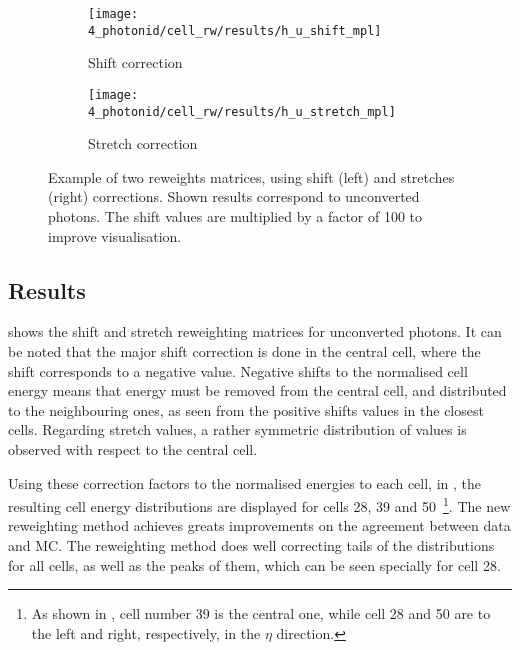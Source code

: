 \begin{figure}[ht!]
    \centering
    \begin{subfigure}[h]{0.49\linewidth}
        \centering
        \texttt{[image: 4\_photonid/cell\_rw/results/h\_u\_shift\_mpl]}
        \caption{Shift correction}
    \end{subfigure}
    \hfill
    \begin{subfigure}[h]{0.49\linewidth}
        \centering
        \texttt{[image: 4\_photonid/cell\_rw/results/h\_u\_stretch\_mpl]}
        \caption{Stretch correction}
    \end{subfigure}
    \caption{Example of two reweights matrices, using shift (left) and stretches (right) corrections. Shown results correspond to unconverted photons. The shift values are multiplied by a factor of 100 to improve visualisation.}
    \label{fig:ss_corrections:cell_rw:calculation:new:reweights}
\end{figure}









\subsection{Results}
\label{subsec:ss_corrections:cell_rw:results}

\Fig{\ref{fig:ss_corrections:cell_rw:calculation:new:reweights}} shows the shift and stretch reweighting matrices for unconverted photons. It can be noted that the major shift correction is done in the central cell, where the shift corresponds to a negative value. Negative shifts to the normalised cell energy means that energy must be removed from the central cell, and distributed to the neighbouring ones, as seen from the positive shifts values in the closest cells. Regarding stretch values, a rather symmetric distribution of values is observed with respect to the central cell.

Using these correction factors to the normalised energies to each cell, in \Fig{\ref{fig:ss_corrections:cell_rw:results:cells}}, the resulting cell energy distributions are displayed for cells 28, 39 and 50~\footnote{As shown in \Fig{\ref{fig:ss_corrections:cell_rw:event_selection:cluster:arrangement}}, cell number 39 is the central one, while cell 28 and 50 are to the left and right, respectively, in the \(\eta\) direction.}. The new reweighting method achieves greats improvements on the agreement between data and MC. The reweighting method does well correcting tails of the distributions for all cells, as well as the peaks of them, which can be seen specially for cell 28.

